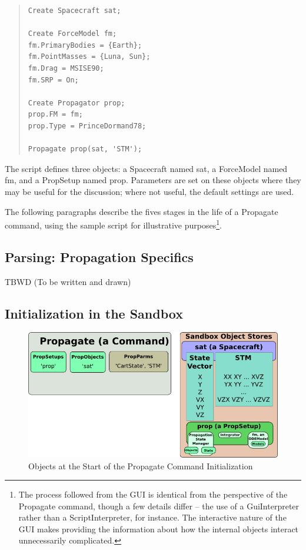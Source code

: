 \documentclass[10pt]{article}
\begin{document}
\begin{quote}
\begin{verbatim}
Create Spacecraft sat;

Create ForceModel fm;
fm.PrimaryBodies = {Earth};
fm.PointMasses = {Luna, Sun};
fm.Drag = MSISE90;
fm.SRP = On;

Create Propagator prop;
prop.FM = fm;
prop.Type = PrinceDormand78;

Propagate prop(sat, 'STM');
\end{verbatim}
\end{quote}

\noindent The script defines three objects: a Spacecraft named sat, a ForceModel named fm, and a PropSetup named prop.  Parameters are set on these objects where they may be useful for the discussion; where not useful, the default settings are used.

The following paragraphs describe the fives stages in the life of a Propagate command, using the sample script for illustrative purposes\footnote{The process followed from the GUI is identical from the perspective of the Propagate command, though a few details differ -- the use of a GuiInterpreter rather than a ScriptInterpreter, for instance.  The interactive nature of the GUI makes providing the information about how the internal objects interact unnecessarily complicated.}.

\subsection{Parsing: Propagation Specifics}

TBWD  (To be written and drawn)

\subsection{Initialization in the Sandbox}

\begin{figure}[htb] 
   \centering
   \includegraphics[371,186]{Images/PersistenceStart.png} 
   \caption{Objects at the Start of the Propagate Command Initialization}
   \label{fig:PersistenceStart}
\end{figure}
\end{document}
